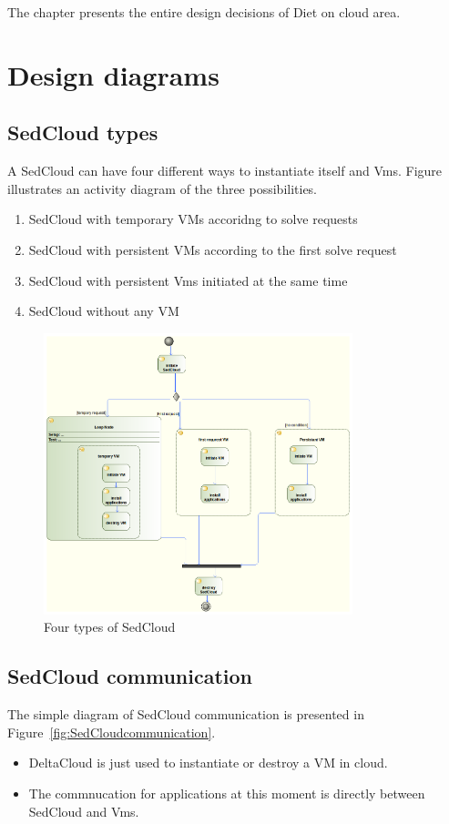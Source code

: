 The chapter presents the entire design decisions of Diet on cloud area.

\section{Design diagrams}
\subsection{SedCloud types}
 A SedCloud can have four different ways to instantiate itself and Vms. Figure illustrates an activity diagram of the three possibilities.
\begin{enumerate}
\item SedCloud with temporary VMs accoridng to solve requests
\item SedCloud with persistent VMs according to the first solve request
\item SedCloud with persistent Vms initiated at the same time
\item SedCloud without any VM
\end{enumerate}

\begin{figure}[!htb]
  \centering
  \includegraphics[width=0.8\textwidth]{fig/ActivityDiagramSedCloud.png}
  \caption{Four types of SedCloud} \label{fig:SedCloudTypes}
\end{figure}

\subsection{SedCloud communication}
The simple diagram of SedCloud communication is presented in Figure~\ref{fig:SedCloudcommunication}. 
\begin{itemize}
\item DeltaCloud is just used to instantiate or destroy a VM in cloud.
\item The commnucation for applications at this moment is directly between SedCloud and Vms. 
\end{itemize}

